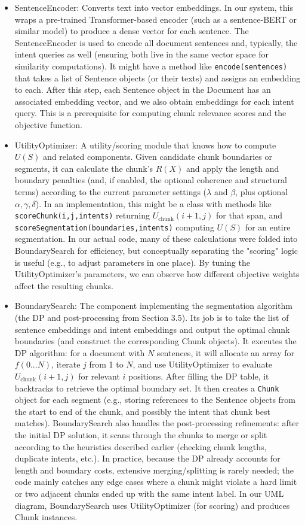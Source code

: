 \documentclass[12pt,a4paper]{report}
\begin{document}
\begin{itemize}
\item SentenceEncoder: Converts text into vector embeddings. In our system, this wraps a pre-trained Transformer-based encoder (such as a sentence-BERT or similar model) to produce a dense vector for each sentence. The SentenceEncoder is used to encode all document sentences and, typically, the intent queries as well (ensuring both live in the same vector space for similarity computations). It might have a method like \texttt{encode(sentences)} that takes a list of Sentence objects (or their texts) and assigns an embedding to each. After this step, each Sentence object in the Document has an associated embedding vector, and we also obtain embeddings for each intent query. This is a prerequisite for computing chunk relevance scores and the objective function.

\item UtilityOptimizer: A utility/scoring module that knows how to compute $U(S)$ and related components. Given candidate chunk boundaries or segments, it can calculate the chunk's $R(X)$ and apply the length and boundary penalties (and, if enabled, the optional coherence and structural terms) according to the current parameter settings ($\lambda$ and $\beta$, plus optional $\alpha, \gamma, \delta$). In an implementation, this might be a class with methods like \texttt{scoreChunk(i,j,intents)} returning $U_{\text{chunk}}(i+1,j)$ for that span, and \texttt{scoreSegmentation(boundaries,intents)} computing $U(S)$ for an entire segmentation. In our actual code, many of these calculations were folded into BoundarySearch for efficiency, but conceptually separating the "scoring" logic is useful (e.g., to adjust parameters in one place). By tuning the UtilityOptimizer's parameters, we can observe how different objective weights affect the resulting chunks.

\item BoundarySearch: The component implementing the segmentation algorithm (the DP and post-processing from Section 3.5). Its job is to take the list of sentence embeddings and intent embeddings and output the optimal chunk boundaries (and construct the corresponding Chunk objects). It executes the DP algorithm: for a document with $N$ sentences, it will allocate an array for $f(0...N)$, iterate $j$ from 1 to $N$, and use UtilityOptimizer to evaluate $U_{\text{chunk}}(i+1,j)$ for relevant $i$ positions. After filling the DP table, it backtracks to retrieve the optimal boundary set. It then creates a \texttt{Chunk} object for each segment (e.g., storing references to the Sentence objects from the start to end of the chunk, and possibly the intent that chunk best matches). BoundarySearch also handles the post-processing refinements: after the initial DP solution, it scans through the chunks to merge or split according to the heuristics described earlier (checking chunk lengths, duplicate intents, etc.). In practice, because the DP already accounts for length and boundary costs, extensive merging/splitting is rarely needed; the code mainly catches any edge cases where a chunk might violate a hard limit or two adjacent chunks ended up with the same intent label. In our UML diagram, BoundarySearch uses UtilityOptimizer (for scoring) and produces Chunk instances.


\end{itemize}
\end{document}
